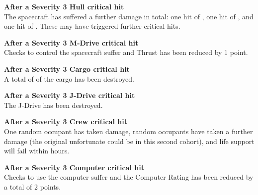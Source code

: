 \documentclass{cheatsheet}
\begin{document}
\begin{landscape}
\textbf{After a Severity 3 Hull critical hit}\\
The spacecraft has suffered a further  damage in total: one
hit of , one hit of , and one hit of .
These may have triggered further critical hits.

\textbf{After a Severity 3 M-Drive critical hit}\\
Checks to control the spacecraft suffer  and Thrust has
been reduced by 1 point.

\textbf{After a Severity 3 Cargo critical hit}\\
A total of  of the cargo has been
destroyed.

\textbf{After a Severity 3 J-Drive critical hit}\\
The J-Drive has been destroyed.

\textbf{After a Severity 3 Crew critical hit}\\
One random occupant has taken  damage,  random
occupants have taken a further  damage (the original
unfortunate could be in this second cohort), and life support will
fail within  hours.

\textbf{After a Severity 3 Computer critical hit}\\
Checks to use the computer suffer  and the Computer Rating
has been reduced by a total of 2 points.

\end{landscape}
\end{document}

